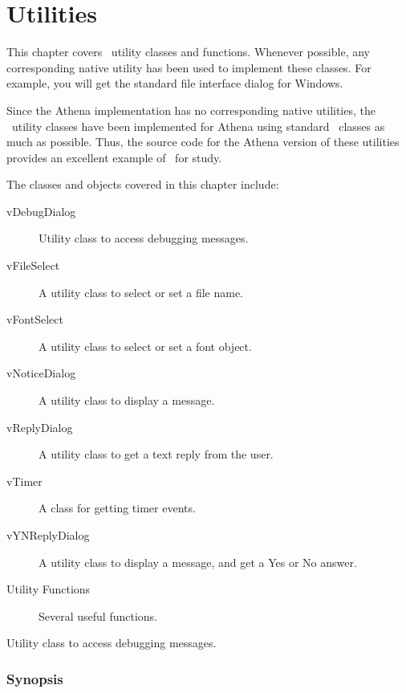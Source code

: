 
\chapter {Utilities}

This chapter covers \V\ utility classes and functions. Whenever
possible, any corresponding native utility has been used to
implement these classes. For example, you will get the standard
file interface dialog for Windows.

Since the Athena implementation has no corresponding native
utilities, the \V\ utility classes have been implemented for
Athena using standard \V\ classes as much as possible. Thus, the
source code for the Athena version of these utilities provides an
excellent example of \V\ for study.

The classes and objects covered in this chapter include:

\begin{description}
	\item[vDebugDialog] Utility class to access debugging messages.
	\item[vFileSelect] A utility class to select or set a file name.
	\item[vFontSelect] A utility class to select or set a font object.
	\item[vNoticeDialog] A utility class to display a message.
	\item[vReplyDialog] A utility class to get a text reply from the user.
	\item[vTimer] A class for getting timer events.
	\item[vYNReplyDialog] A utility class to display a message, and get a Yes or No answer.
	\item[Utility Functions] Several useful functions.
\end{description}


Utility class to access debugging messages.

\subsection* {Synopsis}

